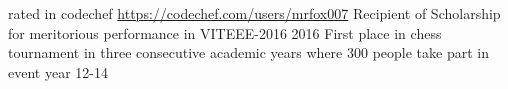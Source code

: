 \begin{cvhonors}
   \cvhonor
      {\faStar \faStar \faStar \faStar}{rated in codechef \url{https://codechef.com/users/mrfox007} }{}{}
   \cvhonor
      {Recipient of Scholarship}{ for meritorious performance in VITEEE-2016}
      {}{2016}
   \cvhonor
      {First place}
      {in chess tournament in three consecutive academic years where 300 people take part in event year}
      {}{12-14}
\end{cvhonors}
